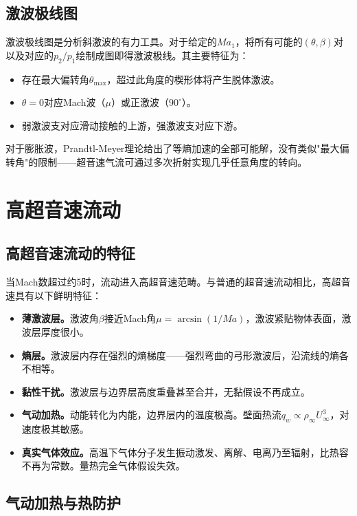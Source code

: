 \subsection{激波极线图}

激波极线图是分析斜激波的有力工具。对于给定的$Ma_1$，将所有可能的$(\theta,\beta)$对以及对应的$p_2/p_1$绘制成图即得激波极线。其主要特征为：

\begin{itemize}
  \item 存在最大偏转角$\theta_{\max}$，超过此角度的楔形体将产生脱体激波。
  \item $\theta=0$对应Mach波（$\mu$）或正激波（$90^{\circ}$）。
  \item 弱激波支对应滑动接触的上游，强激波支对应下游。
\end{itemize}

对于膨胀波，Prandtl-Meyer理论给出了等熵加速的全部可能解，没有类似"最大偏转角"的限制——超音速气流可通过多次折射实现几乎任意角度的转向。

\section{高超音速流动}

\subsection{高超音速流动的特征}

当Mach数超过约5时，流动进入高超音速范畴。与普通的超音速流动相比，高超音速具有以下鲜明特征：

\begin{itemize}
  \item \textbf{薄激波层。}激波角$\beta$接近Mach角$\mu=\arcsin(1/Ma)$，激波紧贴物体表面，激波层厚度很小。
  \item \textbf{熵层。}激波层内存在强烈的熵梯度——强烈弯曲的弓形激波后，沿流线的熵各不相等。
  \item \textbf{黏性干扰。}激波层与边界层高度重叠甚至合并，无黏假设不再成立。
  \item \textbf{气动加热。}动能转化为内能，边界层内的温度极高。壁面热流$q_w \propto \rho_{\infty} U_{\infty}^{3}$，对速度极其敏感。
  \item \textbf{真实气体效应。}高温下气体分子发生振动激发、离解、电离乃至辐射，比热容不再为常数。量热完全气体假设失效。
\end{itemize}

\subsection{气动加热与热防护}


